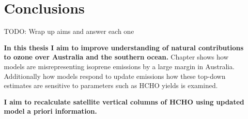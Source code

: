 \chapter{Conclusions} %
\label{Conclusions}

TODO: Wrap up aims and answer each one

\textbf{In this thesis I aim to improve understanding of natural contributions to ozone over Australia and the southern ocean.}
Chapter  shows how models are misrepresenting isoprene emissions by a large margin in Australia. 
Additionally how models respond to update emissions how these top-down estimates are sensitive to parameters such as HCHO yields is examined.



\textbf{I aim to recalculate satellite vertical columns of HCHO using updated model a priori information.}

